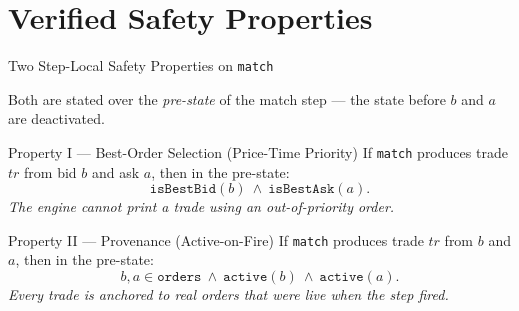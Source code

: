 \section{Verified Safety Properties}

\begin{frame}{Two Step-Local Safety Properties on \texttt{match}}

Both are stated over the \emph{pre-state} of the match step --- the state before $b$ and $a$ are deactivated.

\begin{block}{Property I --- Best-Order Selection (Price-Time Priority)}
If \texttt{match} produces trade $\mathit{tr}$ from bid $b$ and ask $a$, then in the pre-state:
\[
  \texttt{isBestBid}(b)\ \wedge\ \texttt{isBestAsk}(a).
\]
\emph{The engine cannot print a trade using an out-of-priority order.}
\end{block}

\begin{block}{Property II --- Provenance (Active-on-Fire)}
If \texttt{match} produces trade $\mathit{tr}$ from $b$ and $a$, then in the pre-state:
\[
  b, a \in \texttt{orders}\ \wedge\ \texttt{active}(b)\ \wedge\ \texttt{active}(a).
\]
\emph{Every trade is anchored to real orders that were live when the step fired.}
\end{block}

\end{frame}

